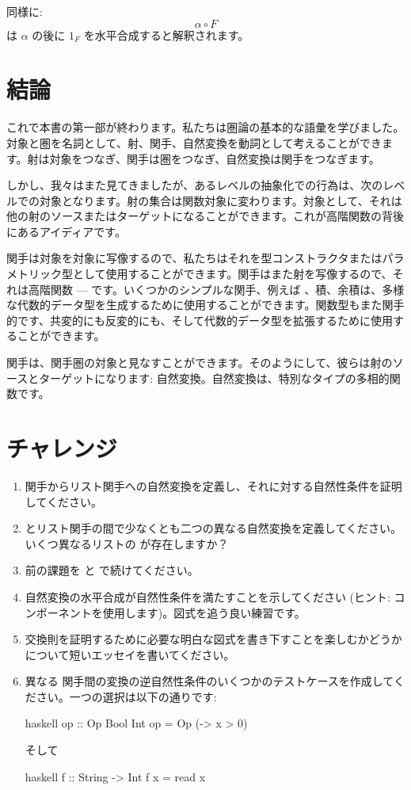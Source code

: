 同様に: 
\[\alpha \circ F\]
は $\alpha$ の後に $1_F$ を水平合成すると解釈されます。

\section{結論}

これで本書の第一部が終わります。私たちは圏論の基本的な語彙を学びました。対象と圏を名詞として、射、関手、自然変換を動詞として考えることができます。射は対象をつなぎ、関手は圏をつなぎ、自然変換は関手をつなぎます。

しかし、我々はまた見てきましたが、あるレベルの抽象化での行為は、次のレベルでの対象となります。射の集合は関数対象に変わります。対象として、それは他の射のソースまたはターゲットになることができます。これが高階関数の背後にあるアイディアです。

関手は対象を対象に写像するので、私たちはそれを型コンストラクタまたはパラメトリック型として使用することができます。関手はまた射を写像するので、それは高階関数 ---  です。いくつかのシンプルな関手、例えば 、積、余積は、多様な代数的データ型を生成するために使用することができます。関数型もまた関手的です、共変的にも反変的にも、そして代数的データ型を拡張するために使用することができます。

関手は、関手圏の対象と見なすことができます。そのようにして、彼らは射のソースとターゲットになります: 自然変換。自然変換は、特別なタイプの多相的関数です。

\section{チャレンジ}

\begin{enumerate}
  \tightlist
  \item
         関手からリスト関手への自然変換を定義し、それに対する自然性条件を証明してください。
  \item
         とリスト関手の間で少なくとも二つの異なる自然変換を定義してください。いくつ異なるリストの \code{()} が存在しますか？
  \item
        前の課題を  と  で続けてください。
  \item
        自然変換の水平合成が自然性条件を満たすことを示してください (ヒント: コンポーネントを使用します)。図式を追う良い練習です。
  \item
        交換則を証明するために必要な明白な図式を書き下すことを楽しむかどうかについて短いエッセイを書いてください。
  \item
        異なる  関手間の変換の逆自然性条件のいくつかのテストケースを作成してください。一つの選択は以下の通りです: 

\begin{snip}{haskell}
op :: Op Bool Int
op = Op (\x -> x > 0)
\end{snip}
そして

\begin{snip}{haskell}
f :: String -> Int
f x = read x
\end{snip}
\end{enumerate}


